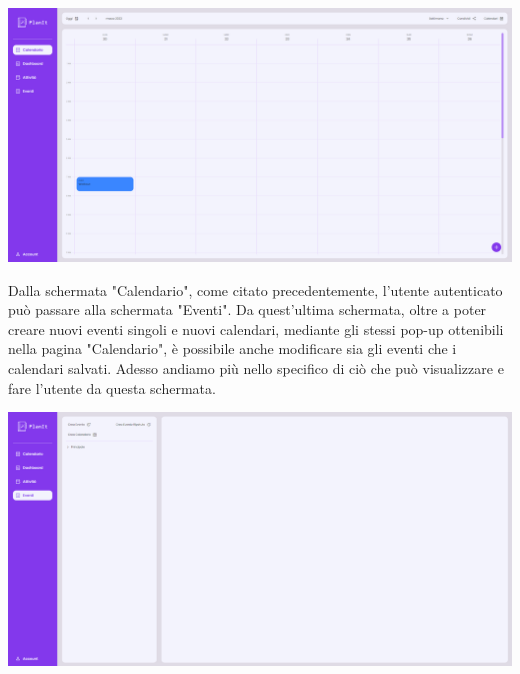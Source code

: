 \begin{center}
    \includegraphics[width=1\textwidth, height=0.3\textheight]{img/png/FrontEnd/Calendario/calendario_futuro.png}
\end{center}

Dalla schermata "Calendario", come citato precedentemente, l'utente autenticato può passare alla schermata "Eventi". Da quest'ultima schermata, oltre a poter creare nuovi eventi singoli e nuovi calendari, mediante gli stessi pop-up ottenibili nella pagina "Calendario", è possibile anche modificare sia gli eventi che i calendari salvati. Adesso andiamo più nello specifico di ciò che può visualizzare e fare l'utente da questa schermata.

\begin{center}
    \includegraphics[width=1\textwidth, height=0.3\textheight]{img/png/FrontEnd/Eventi/schermataEventi.png}
\end{center}

